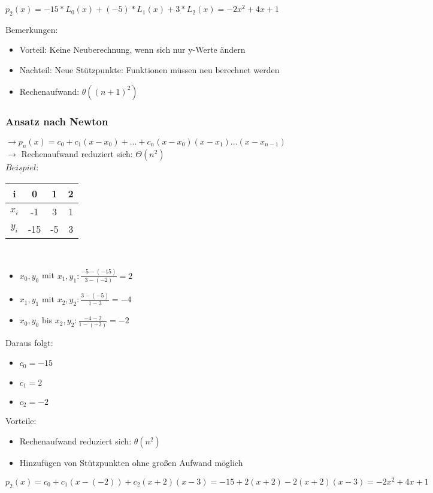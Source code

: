 \documentclass[10pt,landscape,a4paper]{article}
\begin{document}
\begin{multicols}{3}
$p_2(x) = -15 * L_0(x) + (-5) * L_1(x) + 3 * L_2(x) = -2x^2 + 4x + 1$

Bemerkungen:
\begin{itemize}
	\setlength\itemsep{-0.2em}
	\item Vorteil: Keine Neuberechnung, wenn sich nur y-Werte ändern
	\item Nachteil: Neue Stützpunkte: Funktionen müssen neu berechnet werden
	\item Rechenaufwand: $\theta ((n+1)^2)$
\end{itemize}


\subsubsection{Ansatz nach Newton}
$\rightarrow p_n(x) = c_0 + c_1(x-x_0)+...+c_n(x-x_0)(x-x_1)...(x-x_{n-1})$ \\
$\rightarrow$ Rechenaufwand reduziert sich: $\Theta (n^2)$ \\
$\underline{Beispiel}$: \\

\begin{tabular}{c | c c c} 
 i & 0 & 1 & 2 \\
 \hline
 $x_i$ & -1 & 3 & 1 \\
 \hline
 $y_i$ & -15 & -5 & 3
\end{tabular} \\ 

\begin{itemize}
	\setlength\itemsep{-0.2em}
	\item $x_0,y_0$ mit $x_1,y_1: \frac{-5-(-15)}{3-(-2)} = 2$
	\item $x_1,y_1$ mit $x_2,y_2: \frac{3-(-5)}{1-3} = -4$
	\item $x_0,y_0$ bis $x_2,y_2: \frac{-4-2}{1-(-2)} = -2$
\end{itemize}

Daraus folgt:
\begin{itemize}
	\setlength\itemsep{-0.2em}
	\item $c_0 = -15$
	\item $c_1 = 2$
	\item $c_2 = -2$
\end{itemize}

Vorteile:
\begin{itemize}
	\setlength\itemsep{-0.2em}
	\item Rechenaufwand reduziert sich: $\theta (n^2)$
	\item Hinzufügen von Stützpunkten ohne großen Aufwand möglich
\end{itemize}
$p_2(x) = c_0 + c_1(x-(-2))+c_2(x+2)(x-3) = -15+2(x+2)-2(x+2)(x-3) = -2x^2 +4x +1$


\end{multicols}
\end{document}
